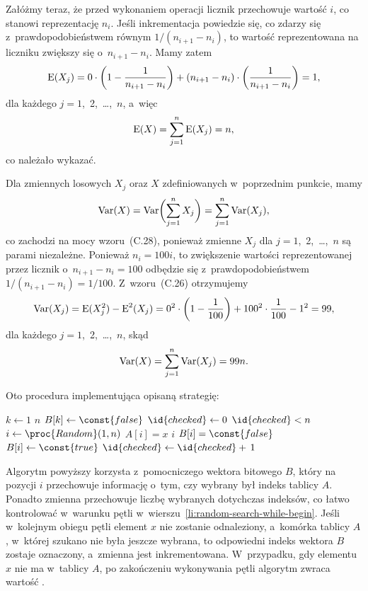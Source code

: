 Załóżmy teraz, że przed wykonaniem  operacji  licznik przechowuje wartość $i$, co stanowi reprezentację $n_i$. Jeśli inkrementacja powiedzie się, co zdarzy się z~prawdopodobieństwem równym $1/(n_{i+1}-n_i)$, to wartość reprezentowana na liczniku zwiększy się o~$n_{i+1}-n_i$. Mamy zatem
\[
	\operatorname{E}(X_j) = 0\cdot\left(1-\frac{1}{n_{i+1}-n_i}\right)+(n_{i+1}-n_i)\cdot\left(\frac{1}{n_{i+1}-n_i}\right) = 1,
\]
dla każdego $j=1$,~2,~\dots,~$n$, a~więc
\[
	\operatorname{E}(X) = \sum_{j=1}^n\operatorname{E}(X_j) = n,
\]
co należało wykazać.

\subproblem %
Dla zmiennych losowych $X_j$ oraz $X$ zdefiniowanych w~poprzednim punkcie, mamy
\[
	\operatorname{Var}(X) = \operatorname{Var}\biggl(\sum_{j=1}^nX_j\biggr) = \sum_{j=1}^n\operatorname{Var}(X_j),
\]
co zachodzi na mocy wzoru~(C.28), ponieważ zmienne $X_j$ dla $j=1$,~2,~\dots,~$n$ są parami niezależne. Ponieważ $n_i=100i$, to zwiększenie wartości reprezentowanej przez licznik o~$n_{i+1}-n_i=100$ odbędzie się z~prawdopodobieństwem $1/(n_{i+1}-n_i)=1/100$. Z~wzoru~(C.26) otrzymujemy
\[
	\operatorname{Var}(X_j) = \operatorname{E}(X_j^2)-\operatorname{E}^2(X_j) = 0^2\cdot\left(1-\frac{1}{100}\right)+100^2\cdot\frac{1}{100}-1^2 = 99,
\]
dla każdego $j=1$,~2,~\dots,~$n$, skąd
\[
	\operatorname{Var}(X) = \sum_{j=1}^n\operatorname{Var}(X_j) = 99n.
\]


\subproblem %
Oto procedura implementująca opisaną strategię:
\begin{codebox}
\li	\For $k\gets1$ \To $n$
\li		\Do $B[k]\gets\const{false}$
		\End
\li	$\id{checked}\gets0$
\li	\While $\id{checked}<n$ \label{li:random-search-while-begin}
\li		\Do
			$i\gets\proc{Random}(1,n)$
\li			\If $A[i]=x$
\li				\Then \Return $i$
\li				\Else
					\If $B[i]=\const{false}$
\li						\Then
							$B[i]\gets\const{true}$
\li							$\id{checked}\gets\id{checked}+\,1$
						\End
				\End
		\End
\li	\Return {}
\end{codebox}
Algorytm powyższy korzysta z~pomocniczego wektora bitowego $B$, który na pozycji $i$ przechowuje informację o~tym, czy wybrany był  indeks tablicy $A$. Ponadto zmienna  przechowuje liczbę wybranych dotychczas indeksów, co łatwo kontrolować w~warunku pętli  w~wierszu~\ref{li:random-search-while-begin}. Jeśli w~kolejnym obiegu pętli element $x$ nie zostanie odnaleziony, a~komórka tablicy $A$, w~której szukano nie była jeszcze wybrana, to odpowiedni indeks wektora $B$ zostaje oznaczony, a~zmienna  jest inkrementowana. W~przypadku, gdy elementu $x$ nie ma w~tablicy $A$, po zakończeniu wykonywania pętli  algorytm zwraca wartość .


